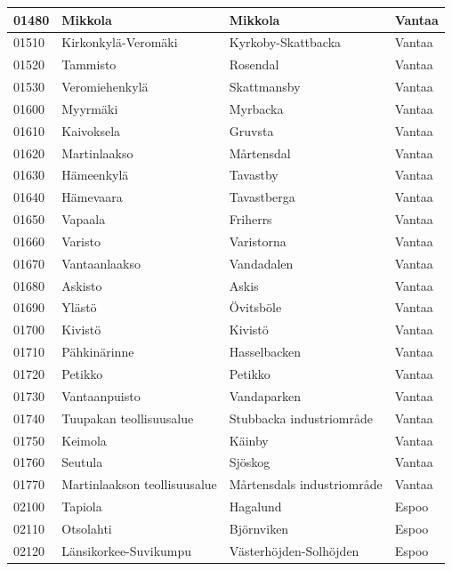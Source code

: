 \begin{longtable}{llll}
    01480 & Mikkola & Mikkola & Vantaa \\ [0.25ex] \hline
    01510 & Kirkonkylä-Veromäki & Kyrkoby-Skattbacka & Vantaa \\ [0.25ex] \hline
    01520 & Tammisto & Rosendal & Vantaa \\ [0.25ex] \hline
    01530 & Veromiehenkylä & Skattmansby & Vantaa \\ [0.25ex] \hline
    01600 & Myyrmäki & Myrbacka & Vantaa \\ [0.25ex] \hline
    01610 & Kaivoksela & Gruvsta & Vantaa \\ [0.25ex] \hline
    01620 & Martinlaakso & Mårtensdal & Vantaa \\ [0.25ex] \hline
    01630 & Hämeenkylä & Tavastby & Vantaa \\ [0.25ex] \hline
    01640 & Hämevaara & Tavastberga & Vantaa \\ [0.25ex] \hline
    01650 & Vapaala & Friherrs & Vantaa \\ [0.25ex] \hline
    01660 & Varisto & Varistorna & Vantaa \\ [0.25ex] \hline
    01670 & Vantaanlaakso & Vandadalen & Vantaa \\ [0.25ex] \hline
    01680 & Askisto & Askis & Vantaa \\ [0.25ex] \hline
    01690 & Ylästö & Övitsböle & Vantaa \\ [0.25ex] \hline
    01700 & Kivistö & Kivistö & Vantaa \\ [0.25ex] \hline
    01710 & Pähkinärinne & Hasselbacken & Vantaa \\ [0.25ex] \hline
    01720 & Petikko & Petikko & Vantaa \\ [0.25ex] \hline
    01730 & Vantaanpuisto & Vandaparken & Vantaa \\ [0.25ex] \hline
    01740 & Tuupakan teollisuusalue & Stubbacka industriområde & Vantaa \\ [0.25ex] \hline
    01750 & Keimola & Käinby & Vantaa \\ [0.25ex] \hline
    01760 & Seutula & Sjöskog & Vantaa \\ [0.25ex] \hline
    01770 & Martinlaakson teollisuusalue & Mårtensdals industriområde & Vantaa \\ [0.25ex] \hline
    02100 & Tapiola & Hagalund & Espoo \\ [0.25ex] \hline
    02110 & Otsolahti & Björnviken & Espoo \\ [0.25ex] \hline
    02120 & Länsikorkee-Suvikumpu & Västerhöjden-Solhöjden & Espoo \\ [0.25ex] \hline

\end{longtable}
